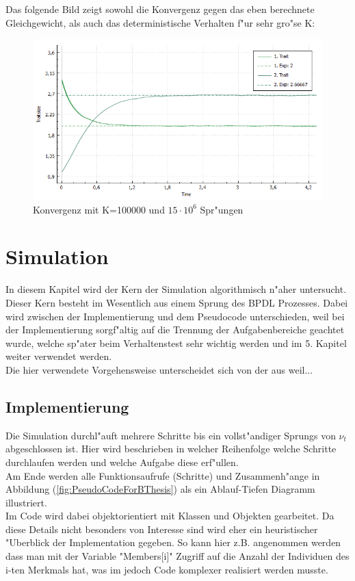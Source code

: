 \documentclass[11pt, a4paper, german]{article}
\begin{document}
	Das folgende Bild zeigt sowohl die Konvergenz gegen das eben berechnete Gleichgewicht, als auch das deterministische Verhalten f"ur sehr gro"se K:
	\begin{figure}[H]
		\centering
		\includegraphics[width=1\linewidth]{./Pictures/BigKInstance_Equillibrium}
		\caption[Konvergenz_K=100000]{Konvergenz mit K=100000 und $ 15\cdot10^6 $ Spr"ungen}
		\label{Konvergenz_K=100000}
	\end{figure}

\clearpage
\section{Simulation}
In diesem Kapitel wird der Kern der Simulation algorithmisch n"aher untersucht. Dieser Kern besteht im Wesentlich aus einem Sprung des BPDL Prozesses.
Dabei wird zwischen der Implementierung und dem Pseudocode unterschieden, weil bei der Implementierung sorgf"altig auf die Trennung der Aufgabenbereiche geachtet wurde, welche sp"ater beim Verhaltenstest sehr wichtig werden und im 5. Kapitel weiter verwendet werden.\\
Die hier verwendete Vorgehensweise unterscheidet sich von der aus \cite{fournier2004microscopic} weil...
	\subsection{Implementierung}
	Die Simulation durchl"auft mehrere Schritte bis ein vollst"andiger Sprungs von $ \nu_t $ abgeschlossen ist. Hier wird beschrieben in welcher Reihenfolge welche Schritte durchlaufen werden und welche Aufgabe diese erf"ullen.\\
	Am Ende werden alle Funktionsaufrufe (Schritte) und Zusammenh"ange in Abbildung (\ref{fig:PseudoCodeForBThesis}) als ein Ablauf-Tiefen Diagramm illustriert.\\
	Im Code wird dabei objektorientiert mit Klassen und Objekten gearbeitet. Da diese Details nicht besonders von Interesse sind wird eher ein heuristischer "Uberblick der Implementation gegeben. So kann hier z.B. angenommen werden dass man mit der Variable "{}Members[i]"{} Zugriff auf die Anzahl der Individuen des i-ten Merkmals hat, was im jedoch Code komplexer realisiert werden musste.\\
	
\end{document}
